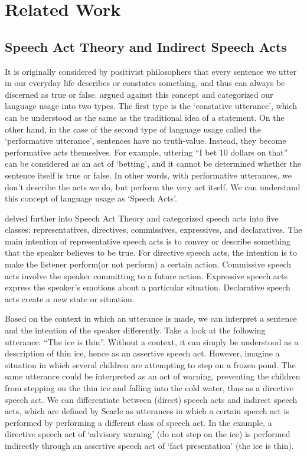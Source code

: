 \section{Related Work}
\subsection*{Speech Act Theory and Indirect Speech Acts}

It is originally considered by positivist philosophers that every sentence we utter in our everyday life describes or constates something, and thus can always be discerned as true or false. \cite{austin} argued against this concept and categorized our language usage into two types. The first type is the ‘constative utterance’, which can be understood as the same as the traditional idea of a statement. On the other hand, in the case of the second type of language usage called the ‘performative utterance’, sentences have no truth-value. Instead, they become performative acts themselves. For example, uttering “I bet 10 dollars on that” can be considered as an act of ‘betting’, and it cannot be determined whether the sentence itself is true or false. In other words, with performative utterances, we don’t describe the acts we do, but perform the very act itself. We can understand this concept of language usage as ‘Speech Acts’.

\cite{searle79} delved further into Speech Act Theory and categorized speech acts into five classes: representatives, directives, commissives, expressives, and declaratives. The main intention of representative speech acts is to convey or describe something that the speaker believes to be true. For directive speech acts, the intention is to make the listener perform(or not perform) a certain action. Commissive speech acts involve the speaker committing to a future action. Expressive speech acts express the speaker’s emotions about a particular situation. Declarative speech acts create a new state or situation.

Based on the context in which an utterance is made, we can interpret a sentence and the intention of the speaker differently. Take a look at the following utterance: “The ice is thin”. Without a context, it can simply be understood as a description of thin ice, hence as an assertive speech act. However, imagine a situation in which several children are attempting to step on a frozen pond. The same utterance could be interpreted as an act of warning, preventing the children from stepping on the thin ice and falling into the cold water, thus as a directive speech act. We can differentiate between (direct) speech acts and indirect speech acts, which are defined by Searle as utterances in which a certain speech act is performed by performing a different class of speech act. In the example, a directive speech act of ‘advisory warning’ (do not step on the ice) is performed indirectly through an assertive speech act of ‘fact presentation’ (the ice is thin).

